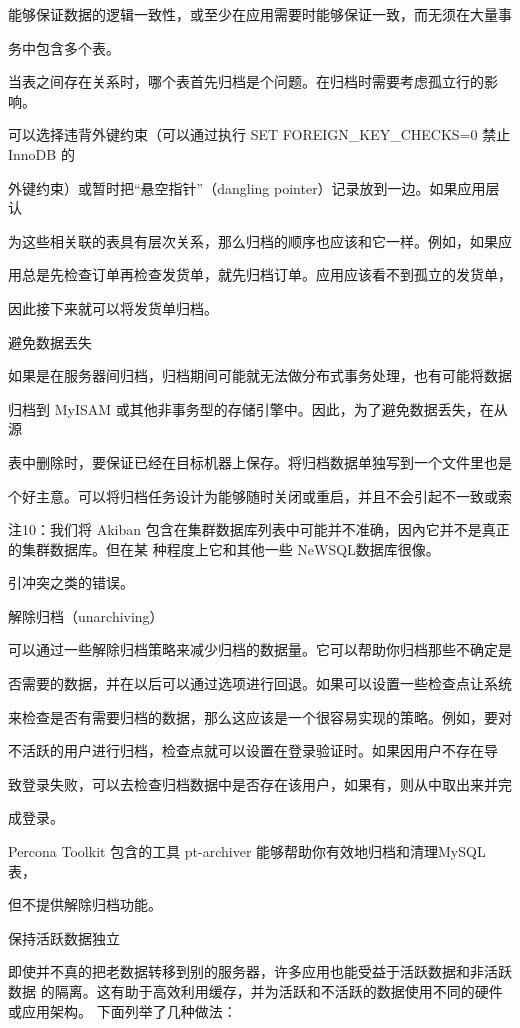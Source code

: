 能够保证数据的逻辑一致性，或至少在应用需要时能够保证一致，而无须在大量事

务中包含多个表。

当表之间存在关系时，哪个表首先归档是个问题。在归档时需要考虑孤立行的影响。

可以选择违背外键约束（可以通过执行 SET FOREIGN\_KEY\_CHECKS=0 禁止InnoDB 的

外键约束）或暂时把“悬空指针”（dangling pointer）记录放到一边。如果应用层认

为这些相关联的表具有层次关系，那么归档的顺序也应该和它一样。例如，如果应

用总是先检查订单再检查发货单，就先归档订单。应用应该看不到孤立的发货单，

因此接下来就可以将发货单归档。

避免数据丟失

如果是在服务器间归档，归档期间可能就无法做分布式事务处理，也有可能将数据

归档到 MyISAM 或其他非事务型的存储引擎中。因此，为了避免数据丢失，在从源

表中删除时，要保证已经在目标机器上保存。将归档数据单独写到一个文件里也是

个好主意。可以将归档任务设计为能够随时关闭或重启，并且不会引起不一致或索

注10：我们将 Akiban 包含在集群数据库列表中可能并不准确，因內它并不是真正的集群数据库。但在某
种程度上它和其他一些 NeWSQL数据库很像。

引冲突之类的错误。

解除归档（unarchiving）

可以通过一些解除归档策略来减少归档的数据量。它可以帮助你归档那些不确定是

否需要的数据，并在以后可以通过选项进行回退。如果可以设置一些检查点让系统

来检查是否有需要归档的数据，那么这应该是一个很容易实现的策略。例如，要对

不活跃的用户进行归档，检查点就可以设置在登录验证时。如果因用户不存在导

致登录失败，可以去检查归档数据中是否存在该用户，如果有，则从中取出来并完

成登录。

Percona Toolkit 包含的工具 pt-archiver 能够帮助你有效地归档和清理MySQL 表，

但不提供解除归档功能。

保持活跃数据独立

即使并不真的把老数据转移到别的服务器，许多应用也能受益于活跃数据和非活跃数据
的隔离。这有助于高效利用缓存，并为活跃和不活跃的数据使用不同的硬件或应用架构。
下面列举了几种做法：

